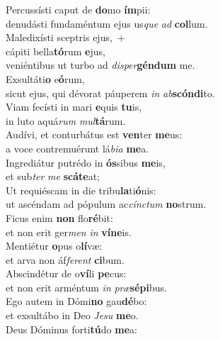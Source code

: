 \evenverse Percussísti caput de \textbf{do}mo \textbf{ím}pii:~\*\\
\evenverse denudásti fundaméntum ejus us\textit{que} \textit{ad} \textbf{col}lum.\\
\oddverse Maledixísti sceptris ejus,~+\\
\oddverse  cápiti bella\textbf{tó}rum \textbf{e}jus,~\*\\
\oddverse veniéntibus ut turbo ad \textit{di}\textit{sper}\textbf{gén}\textbf{dum} me.\\
\evenverse Exsultáti\textbf{o} e\textbf{ó}rum,~\*\\
\evenverse sicut ejus, qui dévorat páuperem \textit{in} \textit{ab}\textbf{scón}\textbf{di}to.\\
\oddverse Viam fecísti in mari \textbf{e}quis \textbf{tu}is,~\*\\
\oddverse in luto aquá\textit{rum} \textit{mul}\textbf{tá}rum.\\
\evenverse Audívi, et conturbátus est \textbf{ven}ter \textbf{me}us:~\*\\
\evenverse a voce contremuérunt lá\textit{bi}\textit{a} \textbf{me}a.\\
\oddverse Ingrediátur putrédo in \textbf{ós}sibus \textbf{me}is,~\*\\
\oddverse et sub\textit{ter} \textit{me} \textbf{scá}\textbf{te}at;\\
\evenverse Ut requiéscam in die tribu\textbf{la}ti\textbf{ó}nis:~\*\\
\evenverse ut ascéndam ad pópulum ac\textit{cín}\textit{ctum} \textbf{no}strum.\\
\oddverse Ficus enim \textbf{non} flo\textbf{ré}bit:~\*\\
\oddverse et non erit ger\textit{men} \textit{in} \textbf{ví}\textbf{ne}is.\\
\evenverse Mentiétur \textbf{o}pus o\textbf{lí}væ:~\*\\
\evenverse et arva non áf\textit{fe}\textit{rent} \textbf{ci}bum.\\
\oddverse Abscindétur de o\textbf{ví}li \textbf{pe}cus:~\*\\
\oddverse et non erit arméntum \textit{in} \textit{præ}\textbf{sé}\textbf{pi}bus.\\
\evenverse Ego autem in Dómi\textbf{no} gau\textbf{dé}bo:~\*\\
\evenverse et exsultábo in Deo \textit{Je}\textit{su} \textbf{me}o.\\
\oddverse Deus Dóminus forti\textbf{tú}do \textbf{me}a:~\*\\
